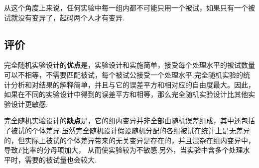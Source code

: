 从这个角度上来说，任何实验中每一组内都不可能只用一个被试，如果只有一个被试就没有变异了，起码两个人才有变异.

\subsection{评价}

完全随机实验设计的\textbf{优点}是，实验设计和实施简单，接受每个处理水平的被试数量可以不相等，不需要匹配被试，每个被试公接受一个处理水平.完全随机实验的统计分析和对结果的解释简单，并且与它的误差平方和相对应的自由度最大。因此，如果在不同的实验设计中得到的误差平方和相等，那么完全随机实验设计比其他实验设计更敏感.

完全随机实验设计的\textbf{缺点}是，它的组内变异并非全部由随机误差组成，其中还包括了被试的个体差异.虽然完全随机设计假设随机分配的各组被试在统计上是无差异的，但实际上被试的个体差异带来的无关变异是存在的，并且混杂在组内变异中，导致$F$比率的分母项加大， 从而使实验较为不敏感.另外，当实验中含多个处理水平时，需要的被试量也会较大.